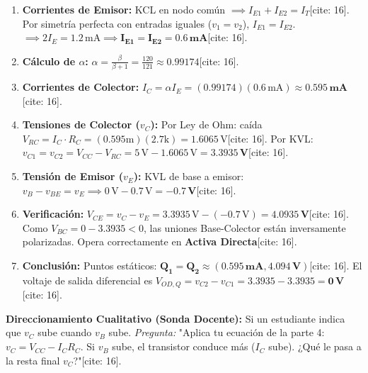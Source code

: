 \documentclass[11pt, a4paper]{article}
\begin{document}
\begin{enumerate}
    \item \textbf{Corrientes de Emisor:} KCL en nodo común $\implies I_{E1} + I_{E2} = I_T$[cite: 16]. Por simetría perfecta con entradas iguales ($v_1=v_2$), $I_{E1} = I_{E2}$. $\implies 2 I_E = 1.2\,\text{mA} \implies \mathbf{I_{E1} = I_{E2} = 0.6\,\text{mA}}$[cite: 16].
    \item \textbf{Cálculo de $\alpha$:} $\alpha = \frac{\beta}{\beta+1} = \frac{120}{121} \approx \mathbf{0.99174}$[cite: 16].
    \item \textbf{Corrientes de Colector:} $I_C = \alpha I_E = (0.99174)(0.6\,\text{mA}) \approx \mathbf{0.595\,\text{mA}}$[cite: 16].
    \item \textbf{Tensiones de Colector ($v_C$):} Por Ley de Ohm: caída $V_{RC} = I_C \cdot R_C = (0.595\text{m})(2.7\text{k}) = 1.6065\,\text{V}$[cite: 16]. Por KVL: $v_{C1} = v_{C2} = V_{CC} - V_{RC} = 5\,\text{V} - 1.6065\,\text{V} = \mathbf{3.3935\,\text{V}}$[cite: 16].
    \item \textbf{Tensión de Emisor ($v_E$):} KVL de base a emisor: $v_B - v_{BE} = v_E \implies 0\,\text{V} - 0.7\,\text{V} = \mathbf{-0.7\,\text{V}}$[cite: 16].
    \item \textbf{Verificación:} $V_{CE} = v_C - v_E = 3.3935\,\text{V} - (-0.7\,\text{V}) = \mathbf{4.0935\,\text{V}}$[cite: 16]. Como $V_{BC} = 0 - 3.3935 < 0$, las uniones Base-Colector están inversamente polarizadas. Opera correctamente en \textbf{Activa Directa}[cite: 16].
    \item \textbf{Conclusión:} Puntos estáticos: $\mathbf{Q_1 = Q_2 \approx (0.595\,\text{mA}, 4.094\,\text{V})}$[cite: 16]. El voltaje de salida diferencial es $V_{OD,Q} = v_{C2} - v_{C1} = 3.3935 - 3.3935 = \mathbf{0\,\text{V}}$[cite: 16].
\end{enumerate}

\textbf{Direccionamiento Cualitativo (Sonda Docente):} Si un estudiante indica que $v_C$ sube cuando $v_B$ sube. \textit{Pregunta:} "Aplica tu ecuación de la parte 4: $v_C = V_{CC} - I_C R_C$. Si $v_B$ sube, el transistor conduce más ($I_C$ sube). ¿Qué le pasa a la resta final $v_C$?"[cite: 16].
\end{document}
